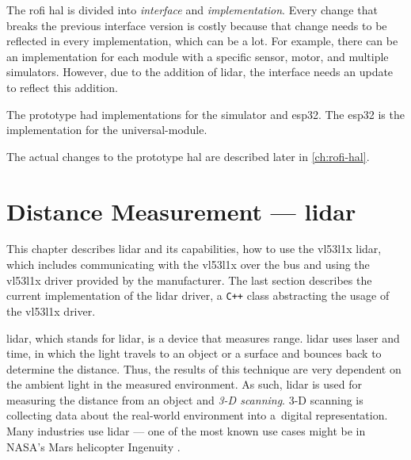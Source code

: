 \documentclass[
  digital,     %
  oneside,     %
  nosansbold,  %
  nocolorbold, %
  nolof,         %
  nolot,         %
]{fithesis4}
\newcommand{\TODO}[1]{#1} %
\newcommand{\TODOLIST}[1]{}
\begin{document}
The \acrshort{rofi} \acrshort{hal} is divided into \emph{interface} and \emph{implementation}. Every
change that breaks the previous interface version is costly because that change needs to be
reflected in every implementation, which can be a lot. For example, there can be an implementation
for each module with a specific sensor, motor, and multiple simulators. However, due to the addition
of \acrshort{lidar}, the interface needs an update to reflect this addition.

The prototype had implementations for the simulator and esp32. The esp32 is the implementation for
the \gls{universal-module}.

The actual changes to the prototype \acrshort{hal} are described later in \autoref{ch:rofi-hal}.

\chapter[ Distance Measurement --- LiDAR ]{ Distance Measurement --- \acrshort{lidar} } \label{sec:lidar}
\TODOLIST{
\begin{itemize}
    \item Walk through \acrshort{lidar} features
    \item Communicating by \acrshort{i2c}
    \item \acrshort{lidar} protocol
\end{itemize}
}
This chapter describes \acrshort{lidar} and its capabilities, how to use the \gls{vl53l1x}
\acrshort{lidar}, which includes communicating with the \gls{vl53l1x} over the bus and using the
\gls{vl53l1x} driver provided by the manufacturer. The last section describes the current
implementation of the \acrshort{lidar} driver, a \verb|C++| class abstracting the usage of the
\gls{vl53l1x} driver.  

\acrshort{lidar}, which stands for \acrlong{lidar}, is a device that measures range.
\acrshort{lidar} uses laser and time, in which the light travels to an object or a surface and
bounces back to determine the distance. Thus, the results of this technique are very dependent on
the ambient light in the measured environment. As such, \acrshort{lidar} is used for measuring the
distance from an object and \emph{3-D scanning}. \mbox{3-D} scanning is collecting data about the
real-world environment into a~digital representation. Many industries use \acrshort{lidar} --- one
of the most known use cases might be in NASA's Mars helicopter Ingenuity \cite{garmin-lidar}.
\end{document}
